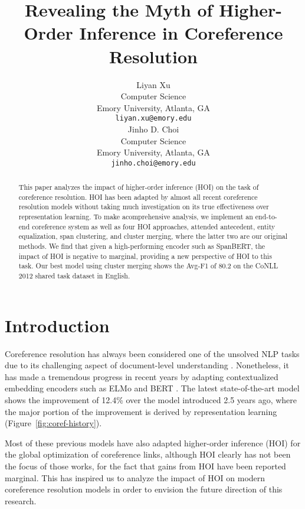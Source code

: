 \documentclass[11pt,a4paper]{article}
\title{Revealing the Myth of Higher-Order Inference in Coreference Resolution}
\author{Liyan Xu \\
  Computer Science \\
  Emory University, Atlanta, GA \\
  \texttt{liyan.xu@emory.edu} \\\And
  Jinho D. Choi \\
  Computer Science \\
  Emory University, Atlanta, GA \\
  \texttt{jinho.choi@emory.edu} \\}
\date{}
\newcommand\LN{\linebreak\noindent}
\begin{document}
\maketitle

\begin{abstract}
This paper analyzes the impact of higher-order inference (HOI) on the task of coreference resolution.
HOI has been adapted by almost all recent coreference resolution models without taking much investigation on its true effectiveness over representation learning.
To make a\LN comprehensive analysis, we implement an end-to-end coreference system as well as four HOI approaches, attended antecedent, entity equalization, span clustering, and cluster merging, where the latter two are our original methods.
We find that given a high-performing encoder such as SpanBERT, the impact of HOI is negative to marginal, providing a new perspective of HOI to this task.
Our best model using cluster merging shows the Avg-F1 of 80.2 on the CoNLL 2012 shared task dataset in English.
\end{abstract}
 \section{Introduction}
\label{sec:intro}

Coreference resolution has always been considered one of the unsolved NLP tasks due to its challenging aspect of document-level understanding \cite{wiseman-etal-2015-learning,wiseman-etal-2016-learning,clark-manning-2015-entity,clark-manning-2016-improving,lee-etal-2017-end}.
Nonetheless, it has made a tremendous progress in recent years by adapting contextualized embedding encoders such as ELMo \cite{lee-etal-2018-higher,fei-etal-2019-end} and BERT \cite{kantor-globerson-2019-coreference,joshi-etal-2019-bert,spanbert-joshi}.
The latest state-of-the-art model shows the improvement of 12.4\% over the model introduced 2.5 years ago, where the major portion of the improvement is derived by representation learning (Figure~\ref{fig:coref-history}).

Most of these previous models have also adapted higher-order inference (HOI) for the global optimization of coreference links, although HOI clearly has not been the focus of those works, for the fact that gains from HOI have been reported marginal.
This has inspired us to analyze the impact of HOI on modern coreference resolution models in order to envision the future direction of this research.
\end{document}
